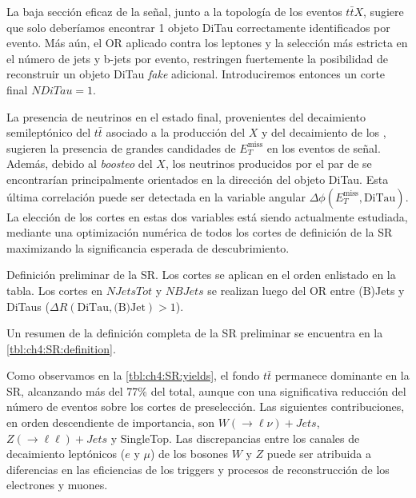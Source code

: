 La baja sección eficaz de la señal, junto a la topología de los eventos $t\bar{t}X$, sugiere que solo deberíamos encontrar 1 objeto DiTau correctamente identificados por evento. Más aún, el OR aplicado contra los leptones y la selección más estricta en el número de jets y b-jets por evento, restringen fuertemente la posibilidad de reconstruir un objeto DiTau \textit{fake} adicional. Introduciremos entonces un corte final $NDiTau = 1$.

La presencia de neutrinos en el estado final, provenientes del decaimiento semileptónico del $t\bar{t}$ asociado a la producción del $X$ y del decaimiento de los \thads, sugieren la presencia de grandes candidades de $E_T^{\text{miss}}$ en los eventos de señal. Además, debido al \textit{boosteo} del $X$, los neutrinos producidos por el par de \thads se encontrarían principalmente orientados en la dirección del objeto DiTau. Esta última correlación puede ser detectada en la variable angular $\Delta\phi(E_T^{\text{miss}}, \text{DiTau})$. La elección de los cortes en estas dos variables está siendo actualmente estudiada, mediante una optimización numérica de todos los cortes de definición de la SR maximizando la significancia esperada de descubrimiento.

\begin{margintable}[-5em]
    
    \caption{Definición preliminar de la SR. Los cortes se aplican en el orden enlistado en la tabla. Los cortes en $NJetsTot$ y $NBJets$ se realizan luego del OR entre (B)Jets y DiTaus ($\Delta R(\text{DiTau}, \text{(B)Jet}) > 1$).}
    \label{tbl:ch4:SR:definition}
\end{margintable}

Un resumen de la definición completa de la SR preliminar se encuentra en la \cref{tbl:ch4:SR:definition}.

 \label{sec:ch4:SR:results}

Como observamos en la \cref{tbl:ch4:SR:yields}, el fondo $t\bar{t}$ permanece dominante en la SR, alcanzando más del 77\% del total, aunque con una significativa reducción del número de eventos sobre los cortes de preselección. Las siguientes contribuciones, en orden descendiente de importancia, son $W(\to\ell\nu) + Jets$, $Z(\to\ell\ell) + Jets$ y SingleTop. Las discrepancias entre los canales de decaimiento leptónicos ($e$ y $\mu$) de los bosones $W$ y $Z$ puede ser atribuida a diferencias en las eficiencias de los triggers y procesos de reconstrucción de los electrones y muones.

